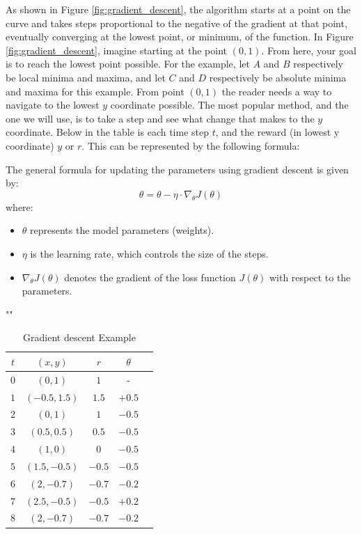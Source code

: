 As shown in Figure \ref{fig:gradient_descent}, the algorithm starts at a point on the curve and takes steps proportional to the negative of the gradient at that point, eventually converging at the lowest point, or minimum, of the function.
In Figure \ref{fig:gradient_descent}, imagine starting at the point $(0, 1)$. From here, your goal is to reach the lowest point possible. For the example, let $A$ and $B$ respectively be local minima and maxima, and let $C$ and $D$ respectively be absolute minima and maxima for this example. From point $(0, 1)$ the reader needs a way to navigate to the lowest $y$ coordinate possible. The most popular method, and the one we will use, is to take a step and see what change that makes to the $y$ coordinate. Below in the table is each time step $t$, and the reward (in lowest y coordinate) $y$ or $r$. This can be represented by the following formula:

The general formula for updating the parameters using gradient descent is given by:
\[
\theta = \theta - \eta \cdot \nabla_\theta J(\theta)
\]
where:
\begin{itemize}
    \item $\theta$ represents the model parameters (weights).
    \item $\eta$ is the learning rate, which controls the size of the steps.
    \item $\nabla_\theta J(\theta)$ denotes the gradient of the loss function $J(\theta)$ with respect to the parameters.
\end{itemize}
"\cite{3b1b_2}"

\begin{center}
    \begin{table}[]
        \centering
        \begin{tabular}{|c|c|c|c|c|}
             \hline
              \(t\) & \((x, y)\) & \(r\) & \(\theta\) \\ [0.5ex]
              \hline
              \(0\) & $(0, 1)$ & $1$ & -\\
              \hline
              \(1\) & $(-0.5, 1.5)$ & $1.5$ & $+0.5$\\
              \hline
              \(2\) & $(0, 1)$ & $1$ & $-0.5$\\
              \hline
              \(3\) & $(0.5, 0.5)$ & $0.5$ & $-0.5$\\
              \hline
              \(4\) & $(1, 0)$ & $0$ & $-0.5$\\
              \hline
              \(5\) & $(1.5, -0.5)$ & $-0.5$ & $-0.5$\\
              \hline
              \(6\) & $(2, -0.7)$ & $-0.7$ & $-0.2$\\
              \hline
              \(7\) & $(2.5, -0.5)$ & $-0.5$ & $+0.2$\\
              \hline
              \(8\) & $(2, -0.7)$ & $-0.7$ & $-0.2$\\[1ex]
              \hline
        \end{tabular}
        \caption{Gradient descent Example}
        \label{tab:my_label}
    \end{table}
\end{center}

